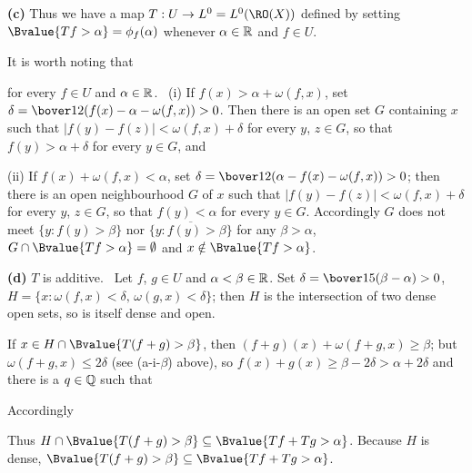 {\medskip

{\bf (c)} Thus we have a map $T:U\to L^0=L^0(\RO(X))$ defined by
setting $\Bvalue{Tf>\alpha}=\phi_f(\alpha)$ whenever $\alpha\in\Bbb R$ and
$f\in U$.

It is worth noting that


\noindent for every $f\in U$ and $\alpha\in\Bbb R$.   \Prf\ (i) If
$f(x)>\alpha+\omega(f,x)$, set
$\delta=\bover12(f(x)-\alpha-\omega(f,x))>0$.   Then there is an open
set $G$ containing $x$ such that $|f(y)-f(z)|<\omega(f,x)+\delta$ for
every $y$, $z\in G$, so that $f(y)>\alpha+\delta$ for every $y\in G$,
and


\noindent (ii) If $f(x)+\omega(f,x)<\alpha$, set
$\delta=\bover12(\alpha-f(x)-\omega(f,x))>0$;  then there is an open
neighbourhood $G$ of $x$ such that $|f(y)-f(z)|<\omega(f,x)+\delta$ for
every $y$, $z\in G$, so that $f(y)<\alpha$ for every $y\in G$.
Accordingly $G$ does not meet $\{y:f(y)>\beta\}$ nor
$\overline{\{y:f(y)>\beta\}}$ for any $\beta>\alpha$,
$G\cap\Bvalue{Tf>\alpha}=\emptyset$ and
$x\notin\Bvalue{Tf>\alpha}$.\ \Qed

\medskip

{\bf (d)} $T$ is additive.   \Prf\ Let $f$, $g\in U$ and
$\alpha<\beta\in\Bbb R$.
Set $\delta=\bover15(\beta-\alpha)>0$,
$H=\{x:\omega(f,x)<\delta,\,\omega(g,x)<\delta\}$;
then $H$ is the intersection of two dense open
sets, so is itself dense and open.

\medskip

 If $x\in H\cap\Bvalue{T(f+g)>\beta}$, then
$(f+g)(x)+\omega(f+g,x)\ge\beta$;  but $\omega(f+g,x)\le 2\delta$ (see
(a-i-$\beta$) above), so $f(x)+g(x)\ge\beta-2\delta>\alpha+2\delta$ and
there is a $q\in\Bbb Q$ such that


\noindent Accordingly


\noindent Thus
$H\cap\Bvalue{T(f+g)>\beta}\subseteq\Bvalue{Tf+Tg>\alpha}$.   Because
$H$ is dense, $\Bvalue{T(f+g)>\beta}\subseteq\Bvalue{Tf+Tg>\alpha}$.

}
